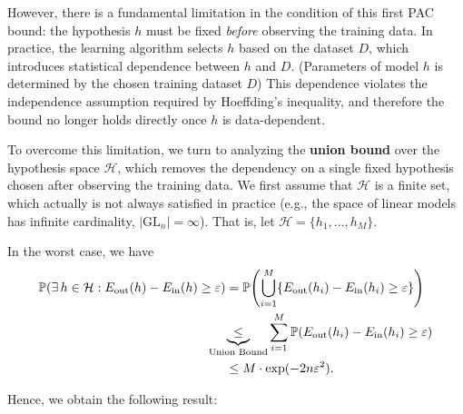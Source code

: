 \documentclass[../main]{subfiles}
\begin{document}
    However, there is a fundamental limitation in the condition of this first PAC bound:  
    the hypothesis $h$ must be fixed \emph{before} observing the training data.  
    In practice, the learning algorithm selects $h$ based on the dataset $D$,  
    which introduces statistical dependence between $h$ and $D$. (Parameters of model $h$ is determined by the chosen training dataset $D$) 
    This dependence violates the independence assumption required by Hoeffding’s inequality,  
    and therefore the bound no longer holds directly once $h$ is data-dependent.

    To overcome this limitation, we turn to analyzing the \textbf{union bound} over the hypothesis space $\mathcal{H}$,  
    which removes the dependency on a single fixed hypothesis chosen after observing the training data.  
    We first assume that $\mathcal{H}$ is a finite set, which actually is not always satisfied in practice  
    (e.g., the space of linear models has infinite cardinality, $|\mathrm{GL}_n| = \infty$).  
    That is, let $\mathcal{H} = \{h_1, \dots, h_M\}$.  
    
    In the worst case, we have
    \begin{align*}
        \mathbb{P}\!\left(\exists\, h \in \mathcal{H} : E_{\rm out}(h) - E_{\rm in}(h) \ge \varepsilon \right)
        &= \mathbb{P}\!\left(\bigcup_{i=1}^M \{E_{\rm out}(h_i) - E_{\rm in}(h_i) \ge \varepsilon\}\right) \\
        &\!\!\!\!\!\!\!\!\!\underbrace{\le}_{\text{Union Bound}} \sum_{i=1}^M
           \mathbb{P}\!\left(E_{\rm out}(h_i) - E_{\rm in}(h_i) \ge \varepsilon\right) \\
        &\le M \cdot \exp(-2n\varepsilon^2).
    \end{align*}
    
    Hence, we obtain the following result:
    
\end{document}
